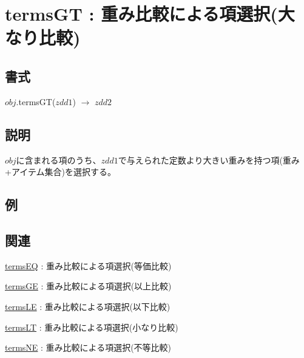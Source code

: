 
\section{termsGT : 重み比較による項選択(大なり比較)\label{sect:termsGT}}
\subsection*{書式}
$obj$.termsGT($zdd1$) $\rightarrow$ $zdd2$

\subsection*{説明}
$obj$に含まれる項のうち、$zdd1$で与えられた定数より大きい重みを持つ項(重み+アイテム集合)を選択する。

\subsection*{例}


\subsection*{関連}
\hyperref[sect:termsEQ]{termsEQ} : 重み比較による項選択(等価比較)

\hyperref[sect:termsGE]{termsGE} : 重み比較による項選択(以上比較)

\hyperref[sect:termsLE]{termsLE} : 重み比較による項選択(以下比較)

\hyperref[sect:termsLT]{termsLT} : 重み比較による項選択(小なり比較)

\hyperref[sect:termsNE]{termsNE} : 重み比較による項選択(不等比較)

